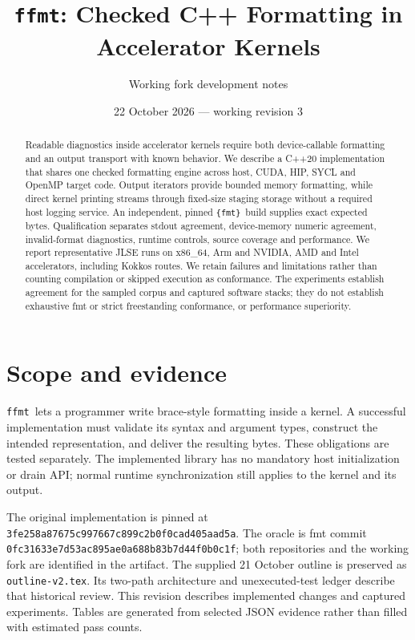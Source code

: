 \documentclass[11pt,letterpaper]{article}
\title{\texttt{ffmt}: Checked C++ Formatting in Accelerator Kernels}
\author{Working fork development notes}
\date{22 October 2026 --- working revision 3}
\newcommand{\ffmt}{\texttt{ffmt}}
\newcommand{\fmtlib}{\texttt{\{fmt\}}}
\begin{document}
\maketitle
\begin{abstract}
Readable diagnostics inside accelerator kernels require both device-callable
formatting and an output transport with known behavior. We describe a C++20
implementation that shares one checked formatting engine across host, CUDA,
HIP, SYCL and OpenMP target code. Output iterators provide bounded memory
formatting, while direct kernel printing streams through fixed-size staging
storage without a required host logging service. An independent, pinned
\fmtlib\ build supplies exact expected bytes. Qualification separates stdout
agreement, device-memory numeric agreement, invalid-format diagnostics, runtime
controls, source coverage and performance. We report representative JLSE runs
on x86\_64, Arm and NVIDIA, AMD and Intel accelerators, including Kokkos routes.
We retain failures and limitations rather than counting compilation or skipped
execution as conformance. The experiments establish agreement for the sampled
corpus and captured software stacks; they do not establish exhaustive fmt or
strict freestanding conformance, or performance superiority.
\end{abstract}

\section{Scope and evidence}

\ffmt\ lets a programmer write brace-style formatting inside a kernel. A
successful implementation must validate its syntax and argument types,
construct the intended representation, and deliver the resulting bytes.
These obligations are tested separately. The implemented library has no
mandatory host initialization or drain API; normal runtime synchronization
still applies to the kernel and its output.

The original implementation is pinned at
\texttt{3fe258a87675c997667c899c2b0f0cad405aad5a}. The oracle is fmt commit
\texttt{0fc31633e7d53ac895ae0a688b83b7d44f0b0c1f}; both repositories and
the working fork are identified in the artifact\cite{ffmt-source,fmt-source}.
The supplied 21 October outline is preserved as \texttt{outline-v2.tex}.
Its two-path architecture and unexecuted-test ledger describe that historical
review. This revision describes implemented changes and captured experiments.
Tables are generated from selected JSON evidence rather than filled with
estimated pass counts.
\end{document}

